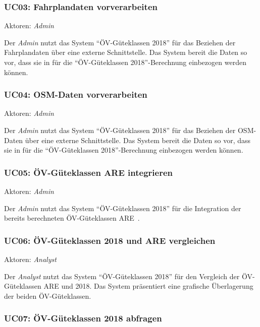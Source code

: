 \subsubsection{UC03: Fahrplandaten vorverarbeiten}
\label{Use Cases:UC03}

Aktoren: \emph{Admin}

Der \emph{Admin} nutzt das System "`\acs{ÖV}-Güteklassen 2018"' für das Beziehen der Fahrplandaten über eine externe Schnittstelle.
Das System bereit die Daten so vor, dass sie in  für die "`\acs{ÖV}-Güteklassen 2018"'-Berechnung einbezogen werden können.

\subsubsection{UC04: OSM-Daten vorverarbeiten}
\label{Use Cases:UC04}

Aktoren: \emph{Admin}

Der \emph{Admin} nutzt das System "`\acs{ÖV}-Güteklassen 2018"' für das Beziehen der \acs{OSM}-Daten über eine externe Schnittstelle.
Das System bereit die Daten so vor, dass sie in  für die "`\acs{ÖV}-Güteklassen 2018"'-Berechnung einbezogen werden können.


\subsubsection{UC05: ÖV-Güteklassen ARE integrieren}
\label{Use Cases:UC05}

Aktoren: \emph{Admin}

Der \emph{Admin} nutzt das System "`\acs{ÖV}-Güteklassen 2018"' für die Integration der bereits berechneten ÖV-Güteklassen ARE~\cite{berechnung_are}.


\subsubsection{UC06: ÖV-Güteklassen 2018 und ARE vergleichen}
\label{Use Cases:UC06}

Aktoren: \emph{Analyst}

Der \emph{Analyst} nutzt das System "`\acs{ÖV}-Güteklassen 2018"' für den Vergleich der \acs{ÖV}-Güteklassen ARE und 2018.
Das System präsentiert eine grafische Überlagerung der beiden \acs{ÖV}-Güteklassen.

\cleardoublepage
\subsubsection{UC07: ÖV-Güteklassen 2018 abfragen}
\label{Use Cases:UC07}

